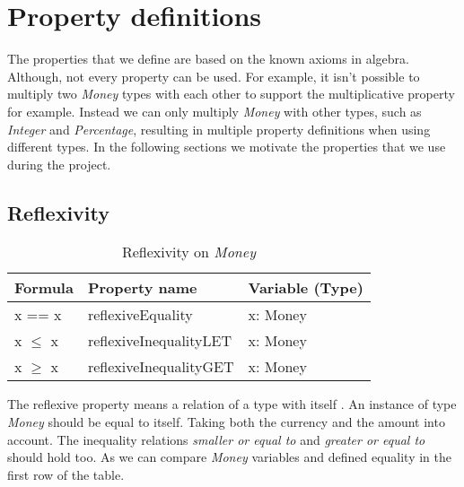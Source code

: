 \section{Property definitions}
The properties that we define are based on the known axioms in algebra. Although, not every property can be used. For example, it isn't possible to multiply two \textit{Money} types with each other to support the multiplicative property for example. Instead we can only multiply \textit{Money} with other types, such as \textit{Integer} and \textit{Percentage}, resulting in multiple property definitions when using different types. In the following sections we motivate the properties that we use during the project.
\subsection*{Reflexivity}
\FloatBarrier
\begin{table}[!ht]
\centering
\begin{tabular}{lll}
\hline
                        \textbf{Formula} & \textbf{Property name} & \textbf{Variable (Type)} \\ \hline
\rowcolor[HTML]{EFEFEF} x == x           & reflexiveEquality      & x: Money                 \\
                        x $\leq$ x       & reflexiveInequalityLET & x: Money                 \\
\rowcolor[HTML]{EFEFEF} x $\geq$ x       & reflexiveInequalityGET & x: Money                 \\ \hline
\end{tabular}
\caption{Reflexivity on \textit{Money}}
\label{tbl:ch4_money_reflexivity}
\end{table}
\FloatBarrier
The reflexive property means a relation of a type with itself \cite{raftery2011perspective}. An instance of type \textit{Money} should be equal to itself. Taking both the currency and the amount into account. The inequality relations \textit{smaller or equal to} and \textit{greater or equal to} should hold too. As we can compare \textit{Money} variables and defined equality in the first row of the table.


